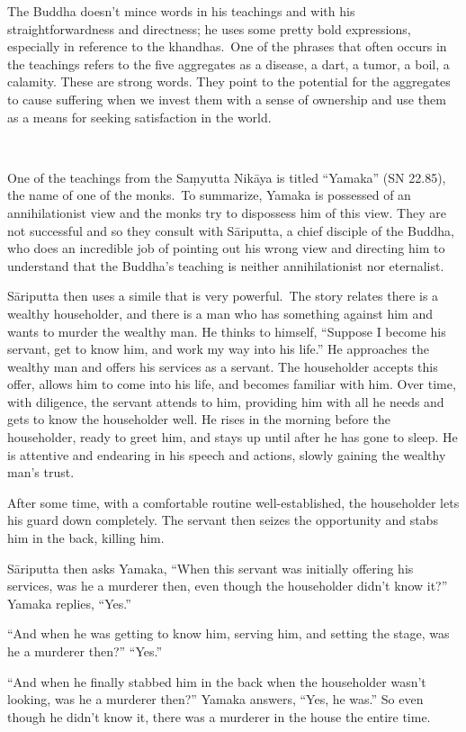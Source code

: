 The Buddha doesn't mince words in his teachings and with his straightforwardness and directness; he uses some pretty bold expressions, especially in reference to the khandhas.~One of the phrases that often occurs in the teachings refers to the five aggregates as a disease, a dart, a tumor, a boil, a calamity. These are strong words. They point to the potential for the aggregates to cause suffering when we invest them with a sense of ownership and use them as a means for seeking satisfaction in the world.~

~

One of the teachings from the Saṃyutta Nikāya is titled ``Yamaka'' (SN 22.85), the name of one of the monks.~To summarize, Yamaka is possessed of an annihilationist view and the monks try to dispossess him of this view. They are not successful and so they consult with Sāriputta, a chief disciple of the Buddha, who does an incredible job of pointing out his wrong view and directing him to understand that the Buddha's teaching is neither annihilationist nor eternalist.

Sāriputta then uses a simile that is very powerful.~The story relates there is a wealthy householder, and there is a man who has something against him and wants to murder the wealthy man. He thinks to himself, ``Suppose I become his servant, get to know him, and work my way into his life.'' He approaches the wealthy man and offers his services as a servant. The householder accepts this offer, allows him to come into his life, and becomes familiar with him. Over time, with diligence, the servant attends to him, providing him with all he needs and gets to know the householder well. He rises in the morning before the householder, ready to greet him, and stays up until after he has gone to sleep. He is attentive and endearing in his speech and actions, slowly gaining the wealthy man's trust.~

After some time, with a comfortable routine well-established, the householder lets his guard down completely. The servant then seizes the opportunity and stabs him in the back, killing him.

Sāriputta then asks Yamaka, ``When this servant was initially offering his services, was he a murderer then, even though the householder didn't know it?'' Yamaka replies, ``Yes.''~

``And when he was getting to know him, serving him, and setting the stage, was he a murderer then?'' ``Yes.''~

``And when he finally stabbed him in the back when the householder wasn't looking, was he a murderer then?'' Yamaka answers, ``Yes, he was.'' So even though he didn't know it, there was a murderer in the house the entire time.

